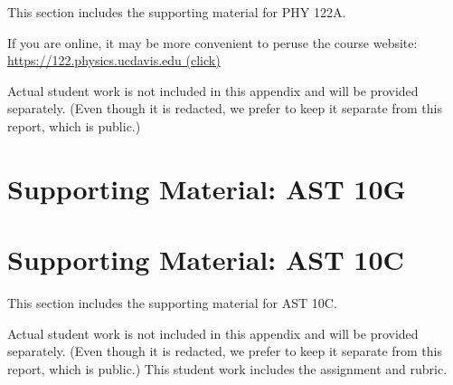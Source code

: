\documentclass[12pt]{article}
\begin{document}
This section includes the supporting material for PHY 122A.

If you are online, it may be more convenient to peruse the course
website: \href{https://122.physics.ucdavis.edu}{https://122.physics.ucdavis.edu
  (click)}

Actual student work is not included in this appendix and will be
provided separately.  (Even though it is redacted, we prefer to keep
it separate from this report, which is public.)

\newpage


  


\section{Supporting Material: AST 10G}
\label{sec:supb}
  

\newpage
\section{Supporting Material: AST 10C}
\label{sec:supc}

This section includes the supporting material for AST 10C.

Actual student work is not included in this appendix and will be
provided separately.  (Even though it is redacted, we prefer to keep
it separate from this report, which is public.)  This student work
includes the assignment and rubric.

\newpage

  
\end{document}
